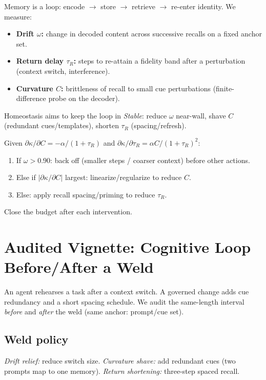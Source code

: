 Memory is a loop: encode \(\to\) store \(\to\) retrieve \(\to\) re-enter identity. We measure:
\begin{itemize}[leftmargin=1.25em]
  \item \textbf{Drift \(\omega\):} change in decoded content across successive recalls on a fixed anchor set.
  \item \textbf{Return delay \(\tau_R\):} steps to re-attain a fidelity band after a perturbation (context switch, interference).
  \item \textbf{Curvature \(C\):} brittleness of recall to small cue perturbations (finite-difference probe on the decoder).
\end{itemize}
Homeostasis aims to keep the loop in \emph{Stable}: reduce \(\omega\) near-wall, shave \(C\) (redundant cues/templates), shorten \(\tau_R\) (spacing/refresh).

\begin{eqbox}
Given \(\partial\kappa/\partial C=-\alpha/(1+\tau_R)\) and \(\partial\kappa/\partial \tau_R=\alpha C/(1+\tau_R)^2\):
\begin{enumerate}[leftmargin=1.25em]
  \item If \(\omega>0.90\): back off (smaller steps / coarser context) before other actions.
  \item Else if \(|\partial\kappa/\partial C|\) largest: linearize/regularize to reduce \(C\).
  \item Else: apply recall spacing/priming to reduce \(\tau_R\).
\end{enumerate}
Close the budget after each intervention.
\end{eqbox}

\section{Audited Vignette: Cognitive Loop Before/After a Weld}
\label{sec:symbolic-vignette}

An agent rehearses a task after a context switch. A governed change adds cue redundancy and a short spacing schedule. We audit the same-length interval \emph{before} and \emph{after} the weld (same anchor: prompt/cue set).

\subsection*{Weld policy}
\textit{Drift relief:} reduce switch size.\quad
\textit{Curvature shave:} add redundant cues (two prompts map to one memory).\quad
\textit{Return shortening:} three-step spaced recall.


